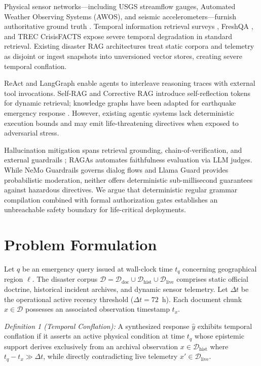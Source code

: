 \documentclass[conference]{IEEEtran}
\begin{document}
Physical sensor networks---including USGS streamflow gauges, Automated Weather Observing Systems (AWOS), and seismic accelerometers---furnish authoritative ground truth \cite{ray,aid}. Temporal information retrieval surveys \cite{campos2020}, FreshQA \cite{freshqa}, and TREC CrisisFACTS \cite{crisisfacts} expose severe temporal degradation in standard retrieval. Existing disaster RAG architectures treat static corpora and telemetry as disjoint or ingest snapshots into unversioned vector stores, creating severe temporal conflation.

ReAct \cite{react} and LangGraph \cite{langgraph} enable agents to interleave reasoning traces with external tool invocations. Self-RAG \cite{selfrag} and Corrective RAG \cite{crag} introduce self-reflection tokens for dynamic retrieval; knowledge graphs have been adapted for earthquake emergency response \cite{zhang2024}. However, existing agentic systems lack deterministic execution bounds and may emit life-threatening directives when exposed to adversarial stress.

Hallucination mitigation spans retrieval grounding, chain-of-verification, and external guardrails \cite{ji,yu2024}; RAGAs \cite{ragas} automates faithfulness evaluation via LLM judges. While NeMo Guardrails \cite{nemoguardrails} governs dialog flows and Llama Guard \cite{inan2023} provides probabilistic moderation, neither offers deterministic sub-millisecond guarantees against hazardous directives. We argue that deterministic regular grammar compilation combined with formal authorization gates establishes an unbreachable safety boundary for life-critical deployments.

\section{Problem Formulation}
Let $q$ be an emergency query issued at wall-clock time $t_q$ concerning geographical region $\ell$. The disaster corpus $\mathcal{D} = \mathcal{D}_{\mathrm{doc}} \cup \mathcal{D}_{\mathrm{hist}} \cup \mathcal{D}_{\mathrm{live}}$ comprises static official doctrine, historical incident archives, and dynamic sensor telemetry. Let $\Delta t$ be the operational active recency threshold ($\Delta t = 72$~h). Each document chunk $x \in \mathcal{D}$ possesses an associated observation timestamp $t_x$.

\textit{Definition 1 (Temporal Conflation):} A synthesized response $\hat{y}$ exhibits temporal conflation if it asserts an active physical condition at time $t_q$ whose epistemic support derives exclusively from an archival observation $x \in \mathcal{D}_{\mathrm{hist}}$ where $t_q - t_x \gg \Delta t$, while directly contradicting live telemetry $x' \in \mathcal{D}_{\mathrm{live}}$.
\end{document}

